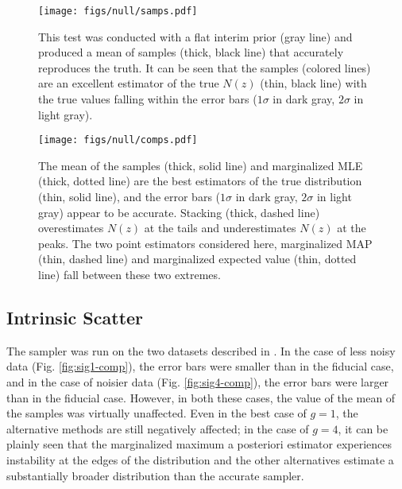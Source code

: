 \begin{figure}
	\texttt{[image: figs/null/samps.pdf]}
	\caption{This test was conducted with a flat interim prior (gray line) and 
		produced a mean of samples (thick, black line) that accurately reproduces the 
		truth.  It can be seen that the samples (colored lines) are an excellent 
		estimator of the true $N(z)$ (thin, black line) with the true values falling 
		within the error bars ($1\sigma$ in dark gray, $2\sigma$ in light gray).}
	\label{fig:null-samp}
\end{figure}

\begin{figure}
	\texttt{[image: figs/null/comps.pdf]}
	\caption{The mean of the samples (thick, solid line) and marginalized MLE 
		(thick, dotted line) are the best estimators of the true distribution (thin, 
		solid line), and the error bars ($1\sigma$ in dark gray, $2\sigma$ in light 
		gray) appear to be accurate.  Stacking (thick, dashed line) overestimates 
		$N(z)$ at the tails and underestimates $N(z)$ at the peaks.  The two point 
		estimators considered here, marginalized MAP (thin, dashed line) and 
		marginalized expected value (thin, dotted line) fall between these two 
		extremes.}
	\label{fig:null-comp}
\end{figure}

\subsection{Intrinsic Scatter}

The sampler was run on the two datasets described in .  In the case of less noisy data (Fig. 
\ref{fig:sig1-comp}), the error bars were smaller than in the fiducial case, 
and in the case of noisier data (Fig. \ref{fig:sig4-comp}), the error bars were 
larger than in the fiducial case.  However, in both these cases, the value of 
the mean of the samples was virtually unaffected.  Even in the best case of 
$g=1$, the alternative methods are still negatively affected; in the case of 
$g=4$, it can be plainly seen that the marginalized maximum a posteriori 
estimator experiences instability at the edges of the distribution and the 
other alternatives estimate a substantially broader distribution than the 
accurate sampler.

